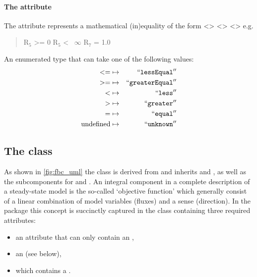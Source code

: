 \paragraph{The  attribute}
The  attribute represents a mathematical (in)equality of the form <> <> <> e.g.
 \begin{quote}\center
 R$_{5}$ >= 0\newline
 R$_{5}$ <~ $\infty$\newline
 R$_{7}$ = 1.0\newline
\end{quote}
An enumerated type that can take one of the following values:
\begin{eqnarray*}
\label{fb-operation-enum}
 \nonumber
  <= & \mapsto & ``\textcolor{black}{\textup{\ttfamily{lessEqual}}}''\\
  >= & \mapsto & ``\textcolor{black}{\textup{\ttfamily{greaterEqual}}}''\\
  < & \mapsto & ``\textcolor{black}{\textup{\ttfamily{less}}}''\\
  > & \mapsto & ``\textcolor{black}{\textup{\ttfamily{greater}}}''\\
  = & \mapsto & ``\textcolor{black}{\textup{\ttfamily{equal}}}''\\
  \textrm{undefined} & \mapsto & ``\textcolor{black}{\textup{\ttfamily{unknown}}}''
\end{eqnarray*}


\subsection{The \FBC {} class}
\label{objective-class}
\label{listoffluxobjectives-class}

As shown in \ref{fig:fbc_uml} the \FBC \Objective class is derived from \SBML \SBase and inherits  and , as well as the subcomponents for \Annotation and \Notes. An integral component in a complete description of a steady-state model is the so-called `objective function' which generally consist of a linear combination of model variables (fluxes) and a sense (direction). In the \FBC package this concept is succinctly captured in the \Objective class containing three required attributes:
\begin{itemize}
  \item {} an attribute that can only contain an ,
  \item {} an  (see below),
  \item {} which contains a \ListOfFluxObjectives.
\end{itemize}

